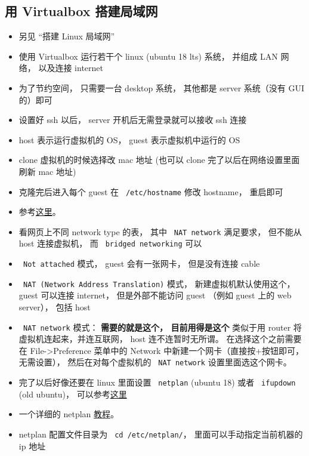 \subsection{用 Virtualbox 搭建局域网}\label{LinWeb_sub1}
\begin{itemize}
\item 另见 “搭建 Linux 局域网”
\item 使用 Virtualbox 运行若干个 linux (ubuntu 18 lts) 系统， 并组成 LAN 网络， 以及连接 internet
\item 为了节约空间， 只需要一台 desktop 系统， 其他都是 server 系统（没有 GUI 的）即可
\item 设置好 ssh 以后， server 开机后无需登录就可以接收 ssh 连接
\item host 表示运行虚拟机的 OS， guest 表示虚拟机中运行的 OS
\item clone 虚拟机的时候选择改 mac 地址 (也可以 clone 完了以后在网络设置里面刷新 mac 地址)
\item 克隆完后进入每个 guest 在 \verb` /etc/hostname` 修改 hostname， 重启即可
\item 参考\href{https://www.thomas-krenn.com/en/wiki/Network_Configuration_in_VirtualBox}{这里}。
\item 看网页上不同 network type 的表， 其中 \verb` NAT network` 满足要求， 但不能从 host 连接虚拟机， 而 \verb` bridged networking` 可以
\item \verb` Not attached` 模式， guest 会有一张网卡， 但是没有连接 cable
\item \verb` NAT (Network Address Translation)` 模式， 新建虚拟机默认使用这个， guest 可以连接 internet， 但是外部不能访问 guest （例如 guest 上的 web server）， 包括 host
\item \verb` NAT network` 模式： \textbf{需要的就是这个， 目前用得是这个} 类似于用 router 将虚拟机连起来，并连互联网， host 连不连暂时无所谓。 在选择这个之前需要在 File->Preference 菜单中的 Network 中新建一个网卡（直接按+按钮即可，无需设置）， 然后在对每个虚拟机的 \verb` NAT network` 设置里面选这个网卡。
\item 完了以后好像还要在 linux 里面设置 \verb` netplan` (ubuntu 18) 或者 \verb` ifupdown` (old ubuntu)， 可以参考\href{https://www.linux.com/tutorials/how-use-netplan-network-configuration-tool-linux/}{这里}
\item 一个详细的 netplan \href{https://linuxconfig.org/netplan-network-configuration-tutorial-for-beginners}{教程}。
\item netplan 配置文件目录为 \verb` cd /etc/netplan/`， 里面可以手动指定当前机器的 ip 地址

\end{itemize}
